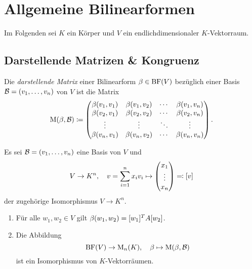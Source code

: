 \chapter{Allgemeine Bilinearformen}

Im Folgenden sei $K$ ein Körper und $V$ ein endlichdimensionaler $K$-Vektorraum.





\section{Darstellende Matrizen \& Kongruenz}

\begin{definition}
  \label{definition: representing matrix for a bilinear form}
  Die \emph{darstellende Matrix} einer Bilinearform $\beta \in \operatorname{BF}(V)$ bezüglich einer Basis $\mathcal{B} = (v_1, \dotsc, v_n)$ von $V$ ist die Matrix
  \[
              \operatorname{M}(\beta, \mathcal{B})
    \coloneqq \begin{pmatrix}
                \beta(v_1, v_1) & \beta(v_1, v_2) & \cdots  & \beta(v_1, v_n) \\
                \beta(v_2, v_1) & \beta(v_2, v_2) & \cdots  & \beta(v_2, v_n) \\
                \vdots          & \vdots          & \ddots  & \vdots          \\
                \beta(v_n, v_1) & \beta(v_n, v_2) & \cdots  & \beta(v_n, v_n)
              \end{pmatrix}.
  \]
\end{definition}

\begin{proposition}
  Es sei $\mathcal{B} = (v_1, \dotsc, v_n)$ eine Basis von $V$ und
  \[
              V
    \to       K^n,
    \quad     v
    =         \sum_{i=1}^n x_i v_i
    \mapsto   \begin{pmatrix} x_1 \\ \vdots \\ x_n \end{pmatrix}
    \eqqcolon [v]
  \]
  der zugehörige Isomorphismus $V \to K^n$.
  \begin{enumerate}
    \item
      Für alle $w_1, w_2 \in V$ gilt $\beta(w_1, w_2) = [w_1]^T A [w_2]$.
    \item
      Die Abbildung
      \[
                \operatorname{BF}(V)
        \to     \operatorname{M}_{n}(K),
        \quad   \beta
        \mapsto \operatorname{M}(\beta, \mathcal{B})     
      \]
      ist ein Isomorphismus von $K$-Vektorräumen.
  \end{enumerate}
\end{proposition}

